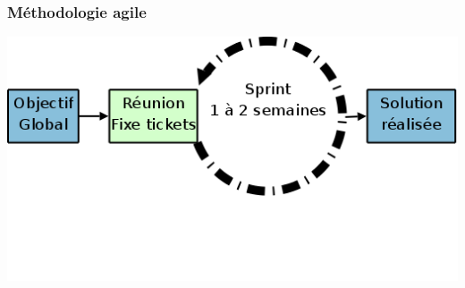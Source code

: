 \begin{frame}\frametitle{Méthodologie agile}
\vfill
\includegraphics[width=1\linewidth]{../image/agileDev.png}
\end{frame}
